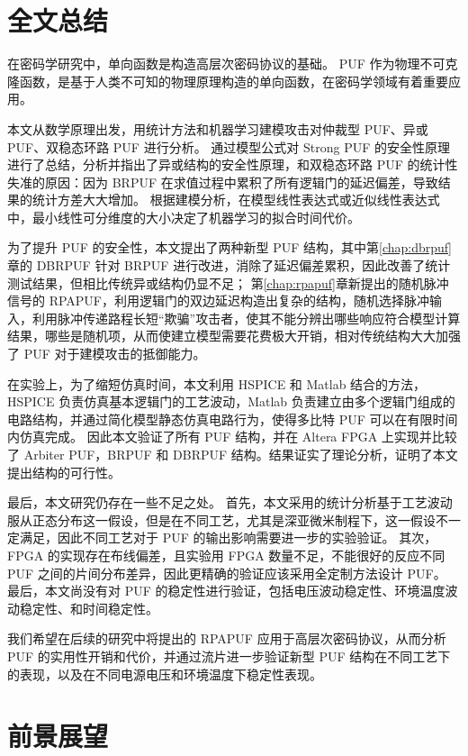
\label{chap:conclusion}
\section{全文总结}
在密码学研究中，单向函数是构造高层次密码协议的基础。 PUF 作为物理不可克隆函数，是基于人类不可知的物理原理构造的单向函数，在密码学领域有着重要应用。

本文从数学原理出发，用统计方法和机器学习建模攻击对仲裁型 PUF、异或 PUF、双稳态环路 PUF 进行分析。
通过模型公式对 Strong PUF 的安全性原理进行了总结，分析并指出了异或结构的安全性原理，和双稳态环路 PUF 的统计性失准的原因：因为 BRPUF 在求值过程中累积了所有逻辑门的延迟偏差，导致结果的统计方差大大增加。
根据建模分析，在模型线性表达式或近似线性表达式中，最小线性可分维度的大小决定了机器学习的拟合时间代价。

为了提升 PUF 的安全性，本文提出了两种新型 PUF 结构，其中第\ref{chap:dbrpuf}章的 DBRPUF 针对 BRPUF 进行改进，消除了延迟偏差累积，因此改善了统计测试结果，但相比传统异或结构仍显不足；
第\ref{chap:rpapuf}章新提出的随机脉冲信号的 RPAPUF，利用逻辑门的双边延迟构造出复杂的结构，随机选择脉冲输入，利用脉冲传递路程长短``欺骗''攻击者，使其不能分辨出哪些响应符合模型计算结果，哪些是随机项，从而使建立模型需要花费极大开销，相对传统结构大大加强了 PUF 对于建模攻击的抵御能力。

在实验上，为了缩短仿真时间，本文利用 HSPICE 和 Matlab 结合的方法，HSPICE 负责仿真基本逻辑门的工艺波动，Matlab 负责建立由多个逻辑门组成的电路结构，并通过简化模型静态仿真电路行为，使得多比特 PUF 可以在有限时间内仿真完成。
因此本文验证了所有 PUF 结构，并在 Altera FPGA 上实现并比较了 Arbiter PUF，BRPUF 和 DBRPUF 结构。结果证实了理论分析，证明了本文提出结构的可行性。

最后，本文研究仍存在一些不足之处。
首先，本文采用的统计分析基于工艺波动服从正态分布这一假设，但是在不同工艺，尤其是深亚微米制程下，这一假设不一定满足，因此不同工艺对于 PUF 的输出影响需要进一步的实验验证。
其次，FPGA 的实现存在布线偏差，且实验用 FPGA 数量不足，不能很好的反应不同 PUF 之间的片间分布差异，因此更精确的验证应该采用全定制方法设计 PUF。
最后，本文尚没有对 PUF 的稳定性进行验证，包括电压波动稳定性、环境温度波动稳定性、和时间稳定性。

我们希望在后续的研究中将提出的 RPAPUF 应用于高层次密码协议，从而分析 PUF 的实用性开销和代价，并通过流片进一步验证新型 PUF 结构在不同工艺下的表现，以及在不同电源电压和环境温度下稳定性表现。


\section{前景展望}

